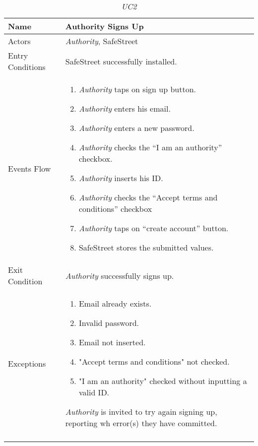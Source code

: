 \documentclass[../../../RASD.tex]{subfiles}
\begin{document}
    \begin{center}
        \begin{longtable}{| p{.35\linewidth} | p{.65\linewidth} |}

            \hline
            \textbf{Name} & \textbf{Authority Signs Up}\\ \hline
            Actors & \textit{Authority}, SafeStreet\\ \hline
            Entry Conditions & SafeStreet successfully installed.\\ \hline
            Events Flow &
            \begin{enumerate}
                \item \textit{Authority} taps on sign up button.
                \item \textit{Authority} enters his email.
                \item \textit{Authority} enters a new password.
                \item \textit{Authority} checks the “I am an authority” checkbox.
                \item \textit{Authority} inserts his ID.
                \item \textit{Authority} checks the “Accept terms and conditions” checkbox
                \item \textit{Authority} taps on “create account” button.
                \item SafeStreet stores the submitted values.
            \end{enumerate}
            \\ \hline
            Exit Condition & \textit{Authority} successfully signs up.\\ \hline
            Exceptions &
            \begin{enumerate}
                \item Email already exists.
                \item Invalid password.
                \item Email not inserted.
                \item "Accept terms and conditions" not checked.
                \item "I am an authority" checked without inputting a valid ID.
            \end{enumerate}
            \textit{Authority} is invited to try again signing up, reporting wh error(s) they have committed. \\
            \hline
            \caption{\textit{UC2}}
        \end{longtable}
    \end{center}
    
\end{document}
